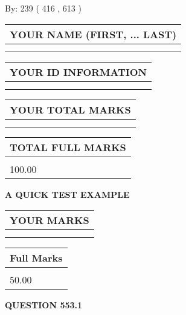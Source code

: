 \documentclass[12pt]{article}
\begin{document}
   
\hspace{1.0in} By: 
 239 ( 416 ,  613 )
   
   
   
   
\newpage 
\setcounter{page}{ 
   553001 } 
   
   
   
   
\noindent\begin{tabular}{|l|}
\hline
YOUR NAME (FIRST, ... LAST)  \\
\hline
 \\ 
 \\ 
\hline
\end{tabular}
\hspace{0.05in} \begin{tabular}{|l|}
\hline
 YOUR   ID   INFORMATION  \\
\hline
 \\ 
 \\ 
\hline
\end{tabular}
   
   
\vspace{0.2in}\noindent\begin{tabular}{|l|}
\hline
YOUR TOTAL MARKS  \\
\hline
 \\ 
 \\ 
\hline
\end{tabular}
\hspace{0.05in} \begin{tabular}{|l|}
\hline
TOTAL FULL MARKS  \\
\hline
 \\ 
100.00 \\
\hline
\end{tabular}
   
   
 \vspace{0.2in}
{\LARGE {\textbf{ A QUICK TEST EXAMPLE}}}
   
   
  
\vspace{0.2in}
  
\noindent\begin{tabular}{|l|}
\hline
 YOUR MARKS  \\
\hline
 \\ 
 \\ 
\hline
\end{tabular}
\hspace{0.05in} \begin{tabular}{|l|}
\hline
 Full Marks  \\
\hline
 \\ 
50.00 \\
\hline
\end{tabular}
{\textbf{\Large{QUESTION
553.1 
}}}
  
\end{document}
